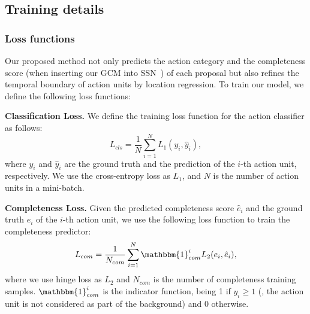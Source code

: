 \documentclass[10pt,journal,compsoc]{IEEEtran}
\begin{document}
	
	
	
	
	
	
	\subsection{Training details}
	
	\subsubsection{Loss functions}
	\label{Sec:loss}
	Our proposed method not only predicts the action category and the completeness score (when inserting our GCM into SSN~\cite{zhao2017temporal}) of each proposal but also refines the temporal boundary of action units by location regression. To train our model, we define the following loss functions:
	
	\noindent \textbf{Classification Loss.} We define the training loss function for the action classifier as follows:
	\begin{equation}
	L_{cls}=\frac{1}{N}\sum_{i=1}^{N} L_{1}(y_i,\hat{y}_i),
	\end{equation}
	where $y_i$ and $\hat{y}_i$ are the ground truth and the prediction of the $i$-th action unit, respectively.
	We use the cross-entropy loss as $L_{1}$, and $N$ is the number of action units in a mini-batch.
	
	\noindent \textbf{Completeness Loss.}
	Given the predicted completeness score $\hat{e}_i$ and the ground truth $e_i$ of the $i$-th action unit, we use the following loss function to train the completeness predictor:
	\begin{equation}
	L_{com}=\frac{1}{N_{com}}\sum_{i=1}^{N} \mathbbm{1}_{com}^i L_{2}(e_i,\hat{e}_i),
	\end{equation}
	where we use hinge loss as $L_{2}$ and $N_{com}$ is the number of completeness training samples. $\mathbbm{1}_{com}^i$ is the indicator function, being 1 if $y_i\ge1$ (\ie, the action unit is not considered as part of the background) and 0 otherwise. 
	
\end{document}

